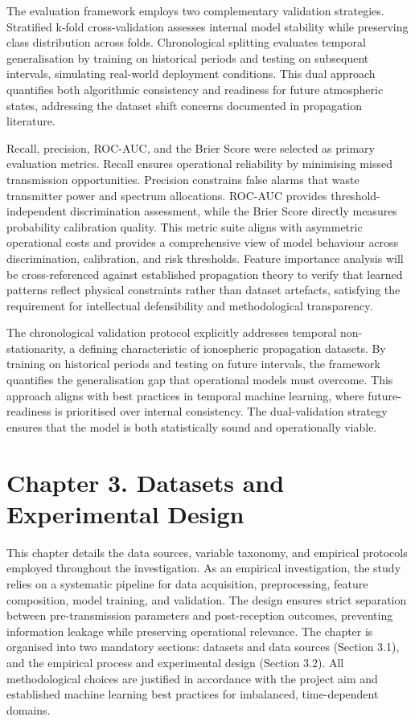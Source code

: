 The evaluation framework employs two complementary validation
strategies. Stratified k-fold cross-validation assesses internal model
stability while preserving class distribution across folds.
Chronological splitting evaluates temporal generalisation by training on
historical periods and testing on subsequent intervals, simulating
real-world deployment conditions. This dual approach quantifies both
algorithmic consistency and readiness for future atmospheric states,
addressing the dataset shift concerns documented in propagation
literature.

Recall, precision, ROC-AUC, and the Brier Score were selected as primary
evaluation metrics. Recall ensures operational reliability by minimising
missed transmission opportunities. Precision constrains false alarms
that waste transmitter power and spectrum allocations. ROC-AUC provides
threshold-independent discrimination assessment, while the Brier Score
directly measures probability calibration quality. This metric suite
aligns with asymmetric operational costs and provides a comprehensive
view of model behaviour across discrimination, calibration, and risk
thresholds. Feature importance analysis will be cross-referenced against
established propagation theory to verify that learned patterns reflect
physical constraints rather than dataset artefacts, satisfying the
requirement for intellectual defensibility and methodological
transparency.

The chronological validation protocol explicitly addresses temporal
non-stationarity, a defining characteristic of ionospheric propagation
datasets. By training on historical periods and testing on future
intervals, the framework quantifies the generalisation gap that
operational models must overcome. This approach aligns with best
practices in temporal machine learning, where future-readiness is
prioritised over internal consistency. The dual-validation strategy
ensures that the model is both statistically sound and operationally
viable.

\section{Chapter 3. Datasets and Experimental
Design}\label{chapter-3.-datasets-and-experimental-design}

This chapter details the data sources, variable taxonomy, and empirical
protocols employed throughout the investigation. As an empirical
investigation, the study relies on a systematic pipeline for data
acquisition, preprocessing, feature composition, model training, and
validation. The design ensures strict separation between
pre-transmission parameters and post-reception outcomes, preventing
information leakage while preserving operational relevance. The chapter
is organised into two mandatory sections: datasets and data sources
(Section 3.1), and the empirical process and experimental design
(Section 3.2). All methodological choices are justified in accordance
with the project aim and established machine learning best practices for
imbalanced, time-dependent domains.

